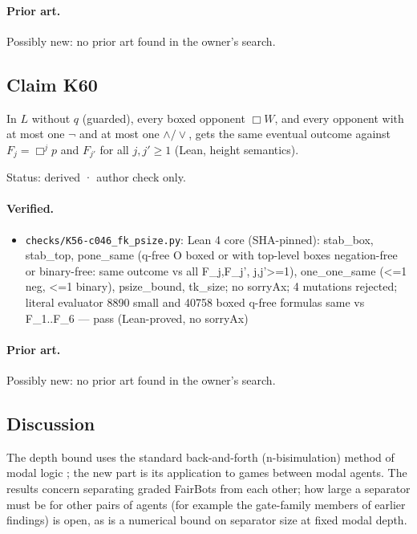 \documentclass{article}
\begin{document}
\paragraph{Prior art.} Possibly new: no prior art found in the owner's search.

\subsection*{Claim K60}

In $L$ without $q$ (guarded), every boxed opponent $\Box W$, and every opponent with at most one $\neg$ and at most one $\land/\lor$, gets the same eventual outcome against $F_j=\Box^jp$ and $F_{j'}$ for all $j,j'\ge1$ (Lean, height semantics).

Status: derived · author check only.

\paragraph{Verified.}
\begin{itemize}
\item \texttt{checks/K56-c046\_fk\_psize.py}: Lean 4 core (SHA-pinned): stab\_box, stab\_top, pone\_same (q-free O boxed or with top-level boxes negation-free or binary-free: same outcome vs all F\_j,F\_j', j,j'\textgreater{}=1), one\_one\_same (\textless{}=1 neg, \textless{}=1 binary), psize\_bound, tk\_size; no sorryAx; 4 mutations rejected; literal evaluator 8890 small and 40758 boxed q-free formulas same vs F\_1..F\_6 --- pass (Lean-proved, no sorryAx)
\end{itemize}

\paragraph{Prior art.} Possibly new: no prior art found in the owner's search.

\subsection*{Discussion}

The depth bound uses the standard back-and-forth (n-bisimulation) method of modal logic
\cite{blackburn2001modal}; the new part is its application to games between modal agents. The
results concern separating graded FairBots from each other; how large a separator must be for
other pairs of agents (for example the gate-family members of earlier findings) is open, as is a
numerical bound on separator size at fixed modal depth.
\end{document}
